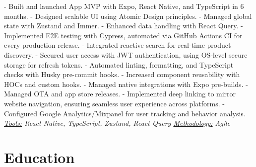 \documentclass[letterpaper]{twentysecondcv} %
\begin{document}
    \newline- Built and launched App MVP with Expo, React Native, and TypeScript in 6 months.
    \newline- Designed scalable UI using Atomic Design principles.
    \newline- Managed global state with Zustand and Immer.
    \newline- Enhanced data handling with React Query. 
    \newline- Implemented E2E testing with Cypress, automated via GitHub Actions CI for every production release.
    \newline- Integrated reactive search for real-time product discovery.
    \newline- Secured user access with JWT authentication, using OS-level secure storage for refresh tokens.
    \newline- Automated linting, formatting, and TypeScript checks with Husky pre-commit hooks.
    \newline- Increased component reusability with HOCs and custom hooks.
    \newline- Managed native integrations with Expo pre-builds.
    \newline- Managed OTA and app store releases.
    \newline- Implemented deep linking to mirror website navigation, ensuring seamless user experience across platforms.
    \newline- Configured Google Analytics/Mixpanel for user tracking and behavior analysis.
\newline\newline\textit{\underline{Tools:} React Native, TypeScript, Zustand, React Query \underline{Methodology:} Agile}
\newline\newline


\section{Education}

\begin{twenty} %

\end{twenty}




\end{document}

